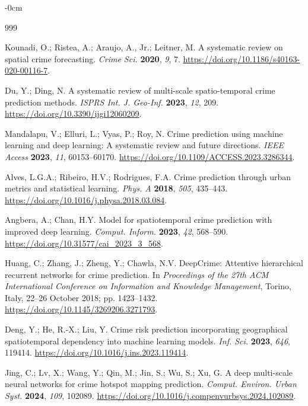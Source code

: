 \documentclass[applsci,article,submit,moreauthors]{Definitions/mdpi}
\begin{document}
\begin{adjustwidth}{-\extralength}{0cm}

\begin{thebibliography}{999}

Kounadi, O.; Ristea, A.; Araujo, A., Jr.; Leitner, M. A systematic review
on spatial crime forecasting. \emph{Crime Sci.} \textbf{2020}, \emph{9}, 7.
\url{https://doi.org/10.1186/s40163-020-00116-7}.

Du, Y.; Ding, N. A systematic review of multi-scale spatio-temporal crime prediction methods. \emph{ISPRS Int. J. Geo-Inf.} \textbf{2023}, \emph{12}, 209. \url{https://doi.org/10.3390/ijgi12060209}.

Mandalapu, V.; Elluri, L.; Vyas, P.; Roy, N. Crime prediction using machine learning and deep learning: A systematic review and future directions. \emph{IEEE Access} \textbf{2023}, \emph{11}, 60153--60170. \url{https://doi.org/10.1109/ACCESS.2023.3286344}.

Alves, L.G.A.; Ribeiro, H.V.; Rodrigues, F.A. Crime prediction through
urban metrics and statistical learning. \emph{Phys. A} \textbf{2018},
\emph{505}, 435--443.
\url{https://doi.org/10.1016/j.physa.2018.03.084}.

Angbera, A.; Chan, H.Y. Model for spatiotemporal crime prediction with
improved deep learning. \emph{Comput. Inform.} \textbf{2023}, \emph{42},
568--590. \url{https://doi.org/10.31577/cai_2023_3_568}.

Huang, C.; Zhang, J.; Zheng, Y.; Chawla, N.V. DeepCrime: Attentive
hierarchical recurrent networks for crime prediction. In
\emph{Proceedings of the 27th ACM International Conference on Information
and Knowledge Management}, Torino, Italy, 22--26 October 2018;
pp. 1423--1432. \url{https://doi.org/10.1145/3269206.3271793}.

Deng, Y.; He, R.-X.; Liu, Y. Crime risk prediction incorporating geographical spatiotemporal dependency into machine learning models. \emph{Inf. Sci.} \textbf{2023}, \emph{646}, 119414. \url{https://doi.org/10.1016/j.ins.2023.119414}.

Jing, C.; Lv, X.; Wang, Y.; Qin, M.; Jin, S.; Wu, S.; Xu, G. A deep multi-scale neural networks for crime hotspot mapping prediction. \emph{Comput. Environ. Urban Syst.} \textbf{2024}, \emph{109}, 102089. \url{https://doi.org/10.1016/j.compenvurbsys.2024.102089}.


\end{thebibliography}
\end{adjustwidth}
\end{document}
